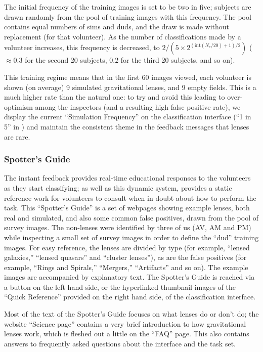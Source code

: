 \documentclass[useAMS,usenatbib,a4paper]{mn2e}
\begin{document}
The initial frequency of the training images is set to be two in five;
subjects are drawn randomly from the pool of training images with this
frequency. The pool contains equal numbers of sims and duds, and the draw is
made without replacement (for that volunteer). As the number of
classifications made by a volunteer increases, this frequency is decreased, to
$2/(5\times2^{(\textrm{int}(N_c/20)+1)/2})$ ($\approx 0.3$ for the second 20
subjects, $0.2$ for the third 20 subjects, and so on).

This training regime means that in the first 60 images viewed, each volunteer
is shown (on average) 9 simulated gravitational lenses, and 9 empty fields. 
This is a much higher rate than the natural one: to try and avoid this leading
to over-optimism among the inspectors (and a resulting high false positive
rate), we display the current ``Simulation Frequency'' on the classification
interface (``1 in 5'' in ) and maintain the consistent
theme in the feedback messages that lenses are rare.


\subsubsection{Spotter's Guide}

The instant feedback provides real-time educational responses to the
volunteers as they start classifying; as well as this dynamic system, \sw
provides a static reference work for volunteers to consult when in doubt about
how to perform the task. This ``Spotter's Guide'' is a set of webpages showing
example lenses, both real and simulated, and also some common false positives,
drawn from the pool of survey images. The non-lenses were identified by three
of us (AV, AM and PM) while inspecting a small set of survey images in order
to define the ``dud'' training images. For easy reference, the lenses are
divided by type (for example, ``lensed galaxies,'' ``lensed quasars'' and
``cluster lenses''), as are the false positives (for example, ``Rings and
Spirals,'' ``Mergers,'' ``Artifacts'' and so on). The example images are
accompanied by explanatory text. The Spotter's Guide is reached via a button
on the left hand side, or the hyperlinked thumbnail images of the ``Quick
Reference'' provided on the right hand side, of the classification interface.

Most of the text of the Spotter's Guide focuses on what lenses do or don't do;
the website ``Science page'' contains a very brief introduction to how
gravitational lenses work, which is fleshed out a little on the ``FAQ'' page. 
This also contains answers to frequently asked questions about the interface
and the task set. 
\end{document}
